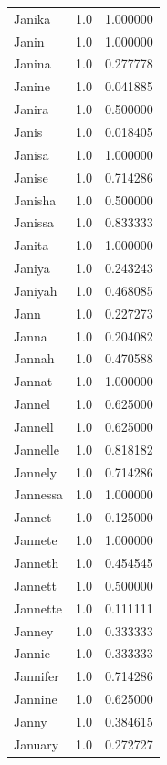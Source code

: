 \documentclass[
  letterpaper,
  DIV=11,
  numbers=noendperiod]{scrreprt}
\begin{document}
\begin{tabular}{lrr}
Janika          &   1.0 &   1.000000 \\
Janin           &   1.0 &   1.000000 \\
Janina          &   1.0 &   0.277778 \\
Janine          &   1.0 &   0.041885 \\
Janira          &   1.0 &   0.500000 \\
Janis           &   1.0 &   0.018405 \\
Janisa          &   1.0 &   1.000000 \\
Janise          &   1.0 &   0.714286 \\
Janisha         &   1.0 &   0.500000 \\
Janissa         &   1.0 &   0.833333 \\
Janita          &   1.0 &   1.000000 \\
Janiya          &   1.0 &   0.243243 \\
Janiyah         &   1.0 &   0.468085 \\
Jann            &   1.0 &   0.227273 \\
Janna           &   1.0 &   0.204082 \\
Jannah          &   1.0 &   0.470588 \\
Jannat          &   1.0 &   1.000000 \\
Jannel          &   1.0 &   0.625000 \\
Jannell         &   1.0 &   0.625000 \\
Jannelle        &   1.0 &   0.818182 \\
Jannely         &   1.0 &   0.714286 \\
Jannessa        &   1.0 &   1.000000 \\
Jannet          &   1.0 &   0.125000 \\
Jannete         &   1.0 &   1.000000 \\
Janneth         &   1.0 &   0.454545 \\
Jannett         &   1.0 &   0.500000 \\
Jannette        &   1.0 &   0.111111 \\
Janney          &   1.0 &   0.333333 \\
Jannie          &   1.0 &   0.333333 \\
Jannifer        &   1.0 &   0.714286 \\
Jannine         &   1.0 &   0.625000 \\
Janny           &   1.0 &   0.384615 \\
January         &   1.0 &   0.272727 \\

\end{tabular}
\end{document}
